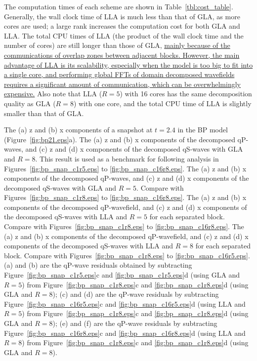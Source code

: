\documentclass[manuscript,ulem,graphix,revised]{geophysics}
\begin{document}
The computation times of each scheme are shown in Table~\ref{tbl:cost_table}. Generally, the wall clock time of LLA is much less than that of GLA, as more cores are used; a large rank increases the computation cost for both GLA and LLA. The total CPU times of LLA (the product of the wall clock time and the number of cores) are still longer than those of GLA, \marginnote{[4]}\uline{mainly because of the communications of overlap zones between adjacent blocks. However, the main advantage of LLA is its scalability, especially when the model is too big to fit into a single core, and performing global FFTs of domain decomposed wavefields requires a significant amount of communication, which can be overwhelmingly expensive.}
Also note that LLA ($R=5$) with 16 cores has the same decomposition quality as GLA ($R=8$) with one core, and the total CPU time of LLA is slightly smaller than that of GLA.


{
The (a) z and (b) x components of a snapshot at $t=2.4$ in the BP model (Figure~\ref{fig:bp21.eps}a).
}
{
The (a) z and (b) x components of the decomposed qP-waves, and (c) z and (d) x components of the decomposed qS-waves with GLA and $R=8$. This result is used as a benchmark for following analysis in Figures~\ref{fig:bp_snap_c1r5.eps} to \ref{fig:bp_snap_c16r8.eps}.
}
{
The (a) z and (b) x components of the decomposed qP-waves, and (c) z and (d) x components of the decomposed qS-waves with GLA and $R=5$. Compare with Figures~\ref{fig:bp_snap_c1r8.eps} to \ref{fig:bp_snap_c16r8.eps}.
}
{
The (a) z and (b) x components of the decomposed qP-wavefield, and (c) z and (d) x components of the decomposed qS-waves with LLA and $R=5$ for each separated block. Compare with Figures~\ref{fig:bp_snap_c1r8.eps} to \ref{fig:bp_snap_c16r8.eps}.
}
{
The (a) z and (b) x components of the decomposed qP-wavefield, and (c) z and (d) x components of the decomposed qS-waves with LLA and $R=8$ for each separated block. Compare with Figures~\ref{fig:bp_snap_c1r8.eps} to \ref{fig:bp_snap_c16r5.eps}.
}
{
(a) and (b) are the qP-wave residuals obtained by subtracting Figure~\ref{fig:bp_snap_c1r5.eps}c and \ref{fig:bp_snap_c1r5.eps}d (using GLA and $R=5$) from Figure~\ref{fig:bp_snap_c1r8.eps}c and \ref{fig:bp_snap_c1r8.eps}d (using GLA and $R=8$); 
(c) and (d) are the qP-wave residuals by subtracting Figure~\ref{fig:bp_snap_c16r5.eps}c and \ref{fig:bp_snap_c16r5.eps}d (using LLA and $R=5$) from Figure~\ref{fig:bp_snap_c1r8.eps}c and \ref{fig:bp_snap_c1r8.eps}d (using GLA and $R=8$);
(e) and (f) are the qP-wave residuals by subtracting Figure~\ref{fig:bp_snap_c16r8.eps}c and \ref{fig:bp_snap_c16r8.eps}d (using LLA and $R=8$) from Figure~\ref{fig:bp_snap_c1r8.eps}c and \ref{fig:bp_snap_c1r8.eps}d (using GLA and $R=8$).
}
\end{document}
